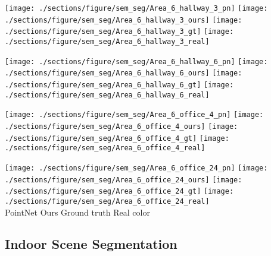 \documentclass[acmtog]{acmart}
\begin{document}
\begin{figure*}[t!]

  \centering

  \texttt{[image: ./sections/figure/sem\_seg/Area\_6\_hallway\_3\_pn]}
  \texttt{[image: ./sections/figure/sem\_seg/Area\_6\_hallway\_3\_ours]}
  \texttt{[image: ./sections/figure/sem\_seg/Area\_6\_hallway\_3\_gt]}
  \texttt{[image: ./sections/figure/sem\_seg/Area\_6\_hallway\_3\_real]}
  
  \texttt{[image: ./sections/figure/sem\_seg/Area\_6\_hallway\_6\_pn]}
  \texttt{[image: ./sections/figure/sem\_seg/Area\_6\_hallway\_6\_ours]}
  \texttt{[image: ./sections/figure/sem\_seg/Area\_6\_hallway\_6\_gt]}
  \texttt{[image: ./sections/figure/sem\_seg/Area\_6\_hallway\_6\_real]}
  
  \texttt{[image: ./sections/figure/sem\_seg/Area\_6\_office\_4\_pn]}
  \texttt{[image: ./sections/figure/sem\_seg/Area\_6\_office\_4\_ours]}
  \texttt{[image: ./sections/figure/sem\_seg/Area\_6\_office\_4\_gt]}
  \texttt{[image: ./sections/figure/sem\_seg/Area\_6\_office\_4\_real]}
  
  \texttt{[image: ./sections/figure/sem\_seg/Area\_6\_office\_24\_pn]}
  \texttt{[image: ./sections/figure/sem\_seg/Area\_6\_office\_24\_ours]}
  \texttt{[image: ./sections/figure/sem\_seg/Area\_6\_office\_24\_gt]}
  \texttt{[image: ./sections/figure/sem\_seg/Area\_6\_office\_24\_real]} 
  \\

 \hspace{0.01\textwidth} {PointNet} \hspace{0.17\textwidth}  {Ours} \hspace{0.15\textwidth}  {Ground truth} \hspace{0.14\textwidth}  {Real color} 
  
  \caption{Semantic segmentation results. From left to right: PointNet, ours, ground truth and point cloud with original color. Notice our model outputs smoother segmentation results, for example, wall (cyan) in top two rows, chairs (red) and columns (magenta) in bottom two rows.}
  \label{fig:sem_seg}
\end{figure*}


\subsection{Indoor Scene Segmentation}
\label{sec:sem_seg}
\end{document}
